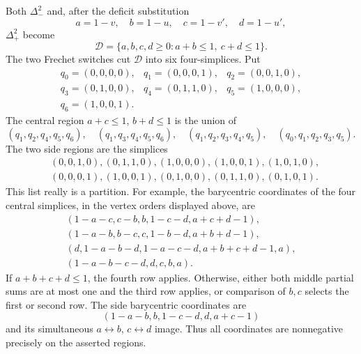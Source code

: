 \documentclass[11pt]{article}
\begin{document}
Both $\Delta_-^2$ and, after the deficit substitution
\[
 a=1-v,\quad b=1-u,\quad c=1-v',\quad d=1-u',
\]
$\Delta_+^2$ become
\[
 \mathcal D=\{a,b,c,d\geq0:a+b\leq1,\ c+d\leq1\}.
\]
The two Frechet switches cut $\mathcal D$ into six four-simplices.  Put
\[
\begin{array}{lll}
q_0=(0,0,0,0),&q_1=(0,0,0,1),&q_2=(0,0,1,0),\\
q_3=(0,1,0,0),&q_4=(0,1,1,0),&q_5=(1,0,0,0),\\
q_6=(1,0,0,1).
\end{array}
\]
The central region $a+c\leq1$, $b+d\leq1$ is the union of
\[
 (q_1,q_2,q_4,q_5,q_6),\quad
 (q_1,q_3,q_4,q_5,q_6),\quad
 (q_1,q_2,q_3,q_4,q_5),\quad
 (q_0,q_1,q_2,q_3,q_5).
\]
The two side regions are the simplices
\[
\begin{split}
 &(0,0,1,0),(0,1,1,0),(1,0,0,0),(1,0,0,1),(1,0,1,0),\\
 &(0,0,0,1),(1,0,0,1),(0,1,0,0),(0,1,1,0),(0,1,0,1).
\end{split}
\]
This list really is a partition.  For example, the barycentric coordinates
of the four central simplices, in the vertex orders displayed above, are
\[
\begin{array}{l}
(1-a-c,c-b,b,1-c-d,a+c+d-1),\\
(1-a-b,b-c,c,1-b-d,a+b+d-1),\\
(d,1-a-b-d,1-a-c-d,a+b+c+d-1,a),\\
(1-a-b-c-d,d,c,b,a).
\end{array}
\]
If $a+b+c+d\leq1$, the fourth row applies.  Otherwise, either both middle
partial sums are at most one and the third row applies, or comparison of
$b,c$ selects the first or second row.  The side barycentric coordinates are
\[
 (1-a-b,b,1-c-d,d,a+c-1)
\]
and its simultaneous $a\leftrightarrow b$, $c\leftrightarrow d$ image.
Thus all coordinates are nonnegative precisely on the asserted regions.
\end{document}
